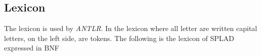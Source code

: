 \subsection{Lexicon}
The lexicon is used by \textit{ANTLR}. In the lexicon where all letter are written capital letters, on the left side, are tokens. The following is the lexicon of SPLAD expressed in BNF